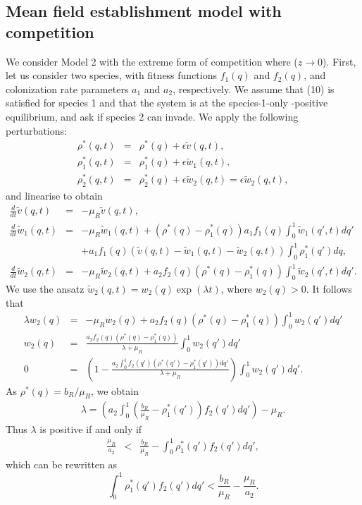 \documentclass[8pt,a4paper]{article}
\begin{document}
\subsection{Mean field establishment model with competition}
We consider Model 2 with the  extreme form of competition where ($z \rightarrow 0$). First, let us consider two species, with fitness functions $f_1(q)$ and $f_2(q)$, and colonization rate parameters $a_1$ and $a_2$, respectively. We assume that (10) is satisfied for species 1 and that the system is at the species-1-only -positive equilibrium, and ask if species 2 can  invade. We apply the following perturbations: 
\begin{eqnarray*}
 \rho^*(q,t)&= &\rho^*(q)+\epsilon \tilde{v}(q,t), \\
 \rho_1^*(q,t)&= &\rho_1^*(q)+\epsilon \tilde{w}_1(q,t), \\
 \rho_2^*(q,t)&= &\rho_2^*(q)+\epsilon \tilde{w}_2(q,t)=\epsilon \tilde{w}_2(q,t),
\end{eqnarray*} 
and linearise to obtain 
\begin{eqnarray*}
\frac{d}{dt} \tilde{v}(q,t) &=& - \mu_R \tilde{v}(q,t),\\
\frac{d}{d t} \tilde{w}_1(q,t) &=& -\mu_R \tilde{w}_1(q,t)+\left(\rho^*(q)-\rho_1^*(q)\right)a_1 f_1(q)\int_0^1 \tilde{w}_1(q',t) dq' \\
& & + a_1 f_1(q) \left(\tilde{v}(q,t)-\tilde{w}_1(q,t)-\tilde{w}_2(q,t)\right)\int_0^1 \rho_1^*(q')dq ,\\
\frac{d}{d t} \tilde{w}_2(q,t) &=& -\mu_R \tilde{w}_2(q,t)+ a_2 f_2(q) \left(\rho^*(q)-\rho_1^*(q)\right) \int_0^1 \tilde{w}_2(q',t) dq'.
\end{eqnarray*}
We use the ansatz  $\tilde{w}_2(q,t)=w_2(q) \exp(\lambda t)$, where $ w_2(q) >0 $. It follows that
\begin{eqnarray*}
\lambda w_2(q)&=& -\mu_R w_2(q)+ a_2 f_2(q)  \left(\rho^*(q)-\rho_1^*(q) \right) \int_0^1 w_2(q') dq'\\ 
w_2(q)&=&\frac{a_2 f_2(q) \left(\rho^*(q)-\rho_1^*(q) \right)}{\lambda + \mu_R} \int_0^1 w_2(q') dq'\\
0&=&\left(1-\frac{a_2 \int_0^1  f_2(q') \left(\rho^*(q')-\rho_1^*(q') \right)dq'}{\lambda + \mu_R} \right)  \int_0^1 w_2(q') dq'.
\end{eqnarray*} 
As $\rho^*(q)= b_R/\mu_R$, we obtain 
\begin{eqnarray*}
 \lambda =\left( a_2 \int_0^1 \left( \frac{b_R}{\mu_R} - \rho_1^*(q')\right) f_2(q')dq' \right)-\mu_R. 
\end{eqnarray*}
Thus $\lambda$ is positive if and only if
\begin{eqnarray*}
 \frac{\mu_R}{a_2} & < &\frac{b_R}{\mu_R} -\int_0^1 \rho_1^*(q') f_2(q') dq',
\end{eqnarray*}
which can be rewritten as 
\begin{equation}
\int_0^1 \rho_1^*(q') f_2(q')dq'  < \frac{b_R}{\mu_R} -\frac{\mu_R}{a_2}. 
\end{equation}
\end{document}
